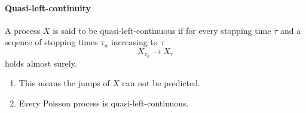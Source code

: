 \paragraph{Quasi-left-continuity}
A process $X$ is said to be quasi-left-continuous if for every stopping
time $\tau$ and a seqence of stopping times $\tau_n$ increasing to $\tau$
\begin{equation}
X_{\tau_n} \to X_{\tau}
\label{}
\end{equation}
holds almost surely.
\begin{enumerate}
\item This means the jumps of $X$ can not be predicted.
\item Every Poisson process is quasi-left-continuous.
\end{enumerate}





